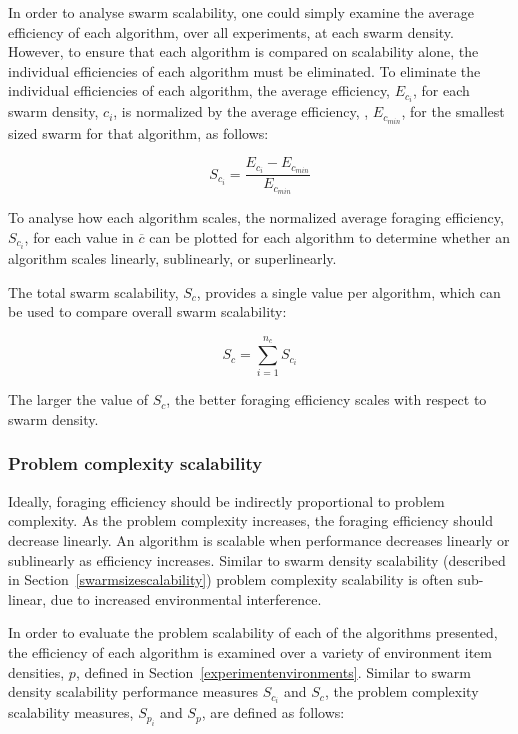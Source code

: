 In order to analyse swarm scalability, one could simply examine the average efficiency of each algorithm, over all experiments, at each swarm density. However, to ensure that each algorithm is compared on scalability alone, the individual efficiencies of each algorithm must be eliminated. To eliminate the individual efficiencies of each algorithm, the average efficiency, $E_{c_i}$, for each swarm density, $c_i$, is normalized by the average efficiency, , $E_{c_{min}}$, for the smallest sized swarm for that algorithm, as follows: 

\begin{equation}
S_{c_i} = \dfrac{E_{c_{i}} - E_{c_{min}}}{E_{c_{min}}}
\end{equation}


To analyse how each algorithm scales, the normalized average foraging efficiency, $S_{c_i}$, for each value in $\overline{c}$ can be plotted for each algorithm to determine whether an algorithm scales linearly, sublinearly, or superlinearly. 

The total swarm scalability, $S_c$, provides a single value per algorithm, which can be used to compare overall swarm scalability:

\begin{equation}
	S_c = \sum_{i=1}^{n_c} S_{c_i}
\end{equation}


The larger the value of $S_c$, the better foraging efficiency scales with respect to swarm density. 



\subsubsection{Problem complexity scalability}
\label{setup:problemscalability}

Ideally, foraging efficiency should be indirectly proportional to problem complexity. As the problem complexity increases, the foraging efficiency should decrease linearly. An algorithm is scalable when performance decreases linearly or sublinearly as efficiency increases. Similar to swarm density scalability (described in Section~\ref{swarmsizescalability}) problem complexity scalability is often sub-linear, due to increased environmental interference. 

In order to evaluate the problem scalability of each of the algorithms presented, the efficiency of each algorithm is examined over a variety of environment item densities, $p$, defined in Section~\ref{experimentenvironments}. Similar to swarm density scalability performance measures $S_{c_i}$ and $S_c$, the problem complexity scalability measures, $S_{p_i}$ and $S_p$, are defined as follows:

